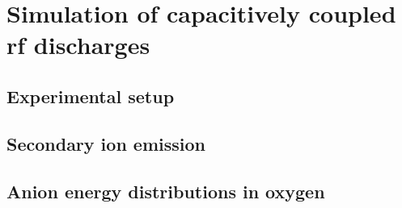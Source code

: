 \chapter{Simulation of capacitively coupled rf discharges}

  \section{Experimental setup}

  \section{Secondary ion emission}
  
  \section{Anion energy distributions in oxygen}
